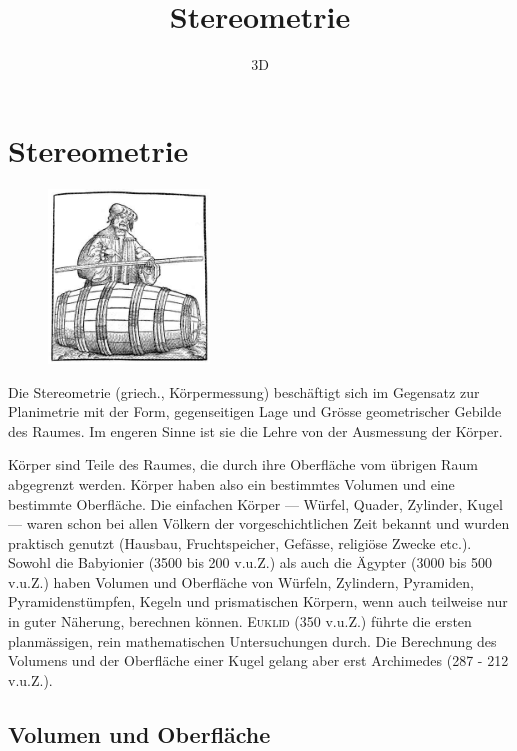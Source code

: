 \documentclass[%
11pt,%
twoside,%
titlepage,%
a4page,%
german,%
headsepline%
]{scrartcl}
\title{Stereometrie}
\subtitle{3D}
\author{}
\date{}
\begin{document}
\maketitle
\tableofcontents
\cleardoublepage

\section{Stereometrie}
\begin{figure}
  \begin{center}
    \includegraphics[width=0.382\textwidth]{pictures/fass}
  \end{center}
\end{figure}
Die Stereometrie (griech., K\"orpermessung) besch\"aftigt
sich im Gegensatz zur Planimetrie mit der Form, gegenseitigen Lage und Gr\"osse geometrischer Gebilde des Raumes. Im engeren Sinne ist sie die Lehre von der Ausmessung der K\"orper.

K\"orper sind Teile des Raumes, die durch ihre Oberfl\"ache vom \"ubrigen Raum abgegrenzt werden. K\"orper haben also ein bestimmtes Volumen und eine bestimmte Oberfl\"ache.
Die einfachen K\"orper --- W\"urfel, Quader, Zylinder, Kugel --- waren schon bei allen V\"olkern der vorgeschichtlichen Zeit bekannt und wurden praktisch genutzt (Hausbau, Fruchtspeicher, Gef\"asse, religi\"ose Zwecke etc.). Sowohl die Babyionier (3500 bis 200 v.u.Z.) als auch die \"Agypter (3000 bis 500 v.u.Z.) haben Volumen und Oberfl\"ache von W\"urfeln, Zylindern, Pyramiden, Pyramidenst\"umpfen, Kegeln und prismatischen K\"orpern, wenn auch teilweise nur in guter N\"aherung, berechnen k\"onnen. \textsc{Euklid} (350 v.u.Z.) f\"uhrte die ersten planm\"assigen, rein mathematischen Untersuchungen durch. Die Berechnung des Volumens und der Oberfl\"ache einer Kugel gelang aber erst Archimedes (287 - 212 v.u.Z.).

\subsection{Volumen und Oberfl\"ache}
\end{document}
